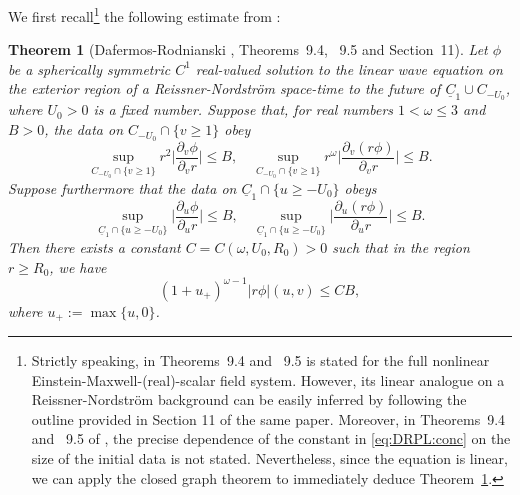 \documentclass[12 pt, reqno]{amsart}
\newtheorem{theorem}{Theorem}[section]
\theoremstyle{definition}
\theoremstyle{remark}
\numberwithin{equation}{section}
\newcommand{\abs}[1]{\vert#1\vert}
\newcommand{\set}[1]{\{#1\}}
\newcommand{\rd}{\partial}
\newcommand{\0}{\emptyset}
\newcommand{\omg}{\omega}
\newcommand{\uC}{\underline{C}}
\begin{document}
We first recall\footnote{Strictly speaking, in \cite{DRPL} Theorems~9.4 and ~9.5 is stated for the full nonlinear Einstein-Maxwell-(real)-scalar field system. However, its linear analogue on a Reissner-Nordstr\"om background can be easily inferred by following the outline provided in Section 11 of the same paper. Moreover, in Theorems~9.4 and ~9.5 of \cite{DRPL}, the precise dependence of the constant in \eqref{eq:DRPL:conc} on the size of the initial data is not stated. Nevertheless, since the equation is linear, we can apply the closed graph theorem to immediately deduce Theorem~\ref{thm:DRPL}.} the following estimate from \cite{DRPL}:
\begin{theorem}[Dafermos-Rodnianski \cite{DRPL}, Theorems~9.4, ~9.5 and Section~11] \label{thm:DRPL}
Let $\phi$ be a spherically symmetric $C^{1}$ real-valued solution to the linear wave equation on the exterior region of a Reissner-Nordstr\"om space-time to the future of $\uC_{1} \cup C_{-U_{0}}$, where $U_{0} > 0$ is a fixed number. Suppose that, for real numbers $1 < \omg \leq 3$ and $B > 0$, the data on $C_{-U_{0}} \cap \set{v \geq 1}$ obey
\begin{equation} \label{eq:DRPL:hyp:C}
	\sup_{C_{-U_{0}} \cap \set{v \geq 1}} r^{2} \abs{\frac{\rd_{v} \phi}{\rd_{v} r}} \leq B, \quad
	\sup_{C_{-U_{0}} \cap \set{v \geq 1}} r^{\omg} \abs{\frac{\rd_{v}(r \phi)}{\rd_{v} r}} \leq B.
\end{equation}
Suppose furthermore that the data on $\uC_{1} \cap \set{u \geq -U_{0}}$ obeys
\begin{equation} \label{eq:DRPL:hyp:uC}
	\sup_{\uC_{1} \cap \set{u \geq -U_{0}}} \abs{\frac{\rd_{u} \phi}{\rd_{u} r}} \leq B, \quad
	\sup_{\uC_{1} \cap \set{u \geq -U_{0}}} \abs{\frac{\rd_{u}(r \phi)}{\rd_{u} r}} \leq B.
\end{equation}
Then there exists a constant $C = C(\omg, U_{0}, R_0) > 0$ such that in the region $r \geq R_0$, we have
\begin{equation} \label{eq:DRPL:conc}
	(1+u_{+})^{\omg-1} \abs{r \phi} (u, v) \leq C B,
\end{equation}
where $u_{+} := \max \set{u, 0}$. 

\end{theorem}
\end{document}

